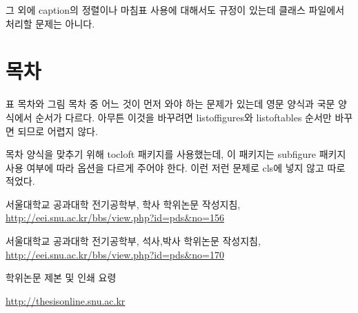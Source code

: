 \documentclass[a4paper]{report}
\begin{document}
그 외에 caption의 정렬이나 마침표 사용에 대해서도
규정이 있는데 클래스 파일에서 처리할 문제는 아니다.

\section{목차}
표 목차와 그림 목차 중 어느 것이 먼저 와야 하는
문제가 있는데 영문 양식과 국문 양식에서 순서가 다르다.
아무튼 이것을 바꾸려면 listoffigures와 listoftables
순서만 바꾸면 되므로 어렵지 않다.

목차 양식을 맞추기 위해 tocloft 패키지를 사용했는데,
이 패키지는
subfigure 패키지 사용 여부에 따라 옵션을 다르게 주어야 한다.
이런 저런 문제로 cls에 넣지 않고 따로 적었다.

\begin{thebibliography}{00}

 서울대학교 공과대학 전기공학부,
학사 학위논문 작성지침,
\url{http://eei.snu.ac.kr/bbs/view.php?id=pds&no=156}

 서울대학교 공과대학 전기공학부,
석사,박사 학위논문 작성지침,
\url{http://eei.snu.ac.kr/bbs/view.php?id=pds&no=170}

 학위논문 제본 및 인쇄 요령

\url{http://thesisonline.snu.ac.kr}
\end{thebibliography}
\end{document}
